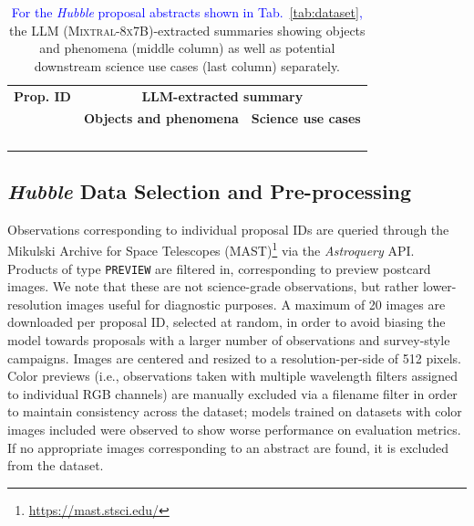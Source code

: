 \documentclass[10pt]{article} %
\newcommand{\package}[1]{\textsl{#1}\xspace}
\newcommand{\hubble}{\emph{Hubble}\xspace}
\newcommand{\changes}[1]{\textcolor{blue}{#1}}
\begin{document}
\begin{table}[h!]
  \renewcommand{\arraystretch}{2}
    \centering
    \begin{tabular}{m{1.8cm} m{6.6cm} m{6.6cm}}
        \toprule
        \bfseries Prop. ID & \multicolumn{2}{c}{\bfseries LLM-extracted summary} \tabularnewline
        \cmidrule(r){2-3}
        & \centering\arraybackslash \bfseries Objects and phenomena & \centering\arraybackslash \bfseries Science use cases \tabularnewline
        \midrule
         & {\scriptsize } & {\scriptsize } \tabularnewline
        \midrule
         & {\scriptsize } & {\scriptsize } \tabularnewline
        \midrule
         & {\scriptsize } & {\scriptsize } \tabularnewline
        \midrule
         & {\scriptsize } & {\scriptsize } \tabularnewline
        \bottomrule
    \end{tabular}
    \caption{\changes{For the \hubble proposal abstracts shown in Tab.~\ref{tab:dataset},} the LLM (\textsc{Mixtral-8x7B})-extracted summaries showing objects and phenomena (middle column) as well as potential downstream science use cases (last column) separately.}
    \label{tab:datasetsumm}
\end{table}

\subsection{\hubble Data Selection and Pre-processing}

Observations corresponding to individual proposal IDs are queried through the Mikulski Archive for Space Telescopes (MAST)\footnote{\url{https://mast.stsci.edu/}} via the \package{Astroquery} \citep{2019AJ....157...98G} API.
%
Products of type \texttt{PREVIEW} are filtered in, corresponding to preview postcard images.
%
We note that these are not science-grade observations, but rather lower-resolution images useful for diagnostic purposes.
%
A maximum of 20 images are downloaded per proposal ID, selected at random, in order to avoid biasing the model towards proposals with a larger number of observations and survey-style campaigns.
%
Images are centered and resized to a resolution-per-side of 512 pixels.
%
Color previews (i.e., observations taken with multiple wavelength filters assigned to individual RGB channels) are manually excluded via a filename filter in order to maintain consistency across the dataset; models trained on datasets with color images included were observed to show worse performance on evaluation metrics.
%
If no appropriate images corresponding to an abstract are found, it is excluded from the dataset.
\end{document}
